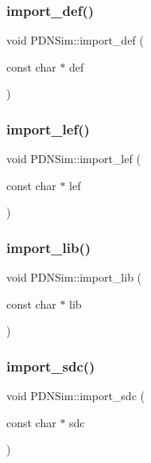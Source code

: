\subsubsection{\texorpdfstring{import\+\_\+def()}{import\_def()}}
{\footnotesize\ttfamily void P\+D\+N\+Sim\+::import\+\_\+def (\begin{DoxyParamCaption}\item[{const char $\ast$}]{def }\end{DoxyParamCaption})}

\mbox{\label{classPDNSim_a7cd5f8f602d788e7fbb8c213e236276a}} 
\subsubsection{\texorpdfstring{import\+\_\+lef()}{import\_lef()}}
{\footnotesize\ttfamily void P\+D\+N\+Sim\+::import\+\_\+lef (\begin{DoxyParamCaption}\item[{const char $\ast$}]{lef }\end{DoxyParamCaption})}

\mbox{\label{classPDNSim_a8befa7206975644695d28766b8da8d35}} 
\subsubsection{\texorpdfstring{import\+\_\+lib()}{import\_lib()}}
{\footnotesize\ttfamily void P\+D\+N\+Sim\+::import\+\_\+lib (\begin{DoxyParamCaption}\item[{const char $\ast$}]{lib }\end{DoxyParamCaption})}

\mbox{\label{classPDNSim_abd78e05ce538d6d5251ae06014029002}} 
\subsubsection{\texorpdfstring{import\+\_\+sdc()}{import\_sdc()}}
{\footnotesize\ttfamily void P\+D\+N\+Sim\+::import\+\_\+sdc (\begin{DoxyParamCaption}\item[{const char $\ast$}]{sdc }\end{DoxyParamCaption})}

